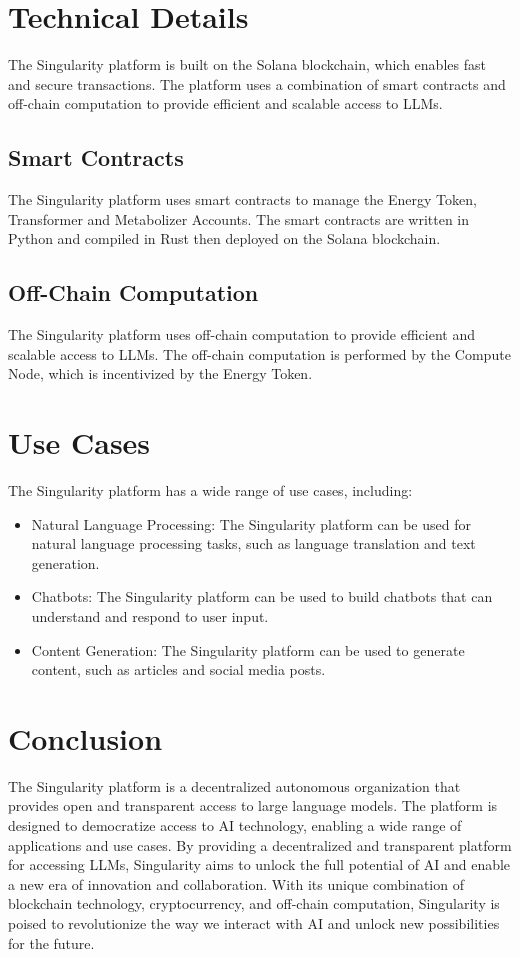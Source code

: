 \documentclass{article}
\begin{document}
\section{Technical Details}

The Singularity platform is built on the Solana blockchain, which enables fast and secure transactions. The platform uses a combination of smart contracts and off-chain computation to provide efficient and scalable access to LLMs.

\subsection{Smart Contracts}

The Singularity platform uses smart contracts to manage the Energy Token, Transformer and Metabolizer Accounts. The smart contracts are written in Python and compiled in Rust then deployed on the Solana blockchain.

\subsection{Off-Chain Computation}

The Singularity platform uses off-chain computation to provide efficient and scalable access to LLMs. The off-chain computation is performed by the Compute Node, which is incentivized by the Energy Token.

\section{Use Cases}

The Singularity platform has a wide range of use cases, including:

\begin{itemize}
\item Natural Language Processing: The Singularity platform can be used for natural language processing tasks, such as language translation and text generation.
\item Chatbots: The Singularity platform can be used to build chatbots that can understand and respond to user input.
\item Content Generation: The Singularity platform can be used to generate content, such as articles and social media posts.
\end{itemize}

\section{Conclusion}

The Singularity platform is a decentralized autonomous organization that provides open and transparent access to large language models. The platform is designed to democratize access to AI technology, enabling a wide range of applications and use cases. By providing a decentralized and transparent platform for accessing LLMs, Singularity aims to unlock the full potential of AI and enable a new era of innovation and collaboration. With its unique combination of blockchain technology, cryptocurrency, and off-chain computation, Singularity is poised to revolutionize the way we interact with AI and unlock new possibilities for the future.
\end{document}
